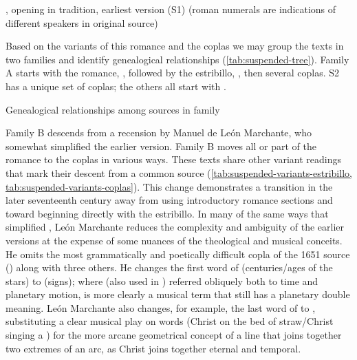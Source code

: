 {, opening  in  tradition, earliest version (S1) (roman numerals are indications of
different speakers in original source)}

Based on the variants of this romance and the coplas we may group the
texts in two families and identify genealogical relationships
(\cref{tab:suspended-tree}). %
Family A starts with the romance, ,
followed by the estribillo, ,
then several coplas.
S2 has a unique set of coplas; the others all start with .

{Genealogical relationships among sources in  family}

Family B descends from a recension by Manuel de León Marchante, who somewhat
simplified the earlier version.%
    \citXXX[on Marchante]
Family B moves all or part of the romance to the coplas in various ways.
These texts share other variant readings that mark their descent from a common
source (\cref{tab:suspended-variants-estribillo, 
tab:suspended-variants-coplas}).
This change demonstrates a transition in the later seventeenth century away from
using introductory romance sections and toward beginning directly with
the estribillo.%
In many of the same ways that  simplified
, León Marchante reduces the complexity and
ambiguity of the earlier versions at the expense of some nuances of the
theological and musical conceits.
He omits the most grammatically and poetically difficult copla of the 1651
source () along with three others.
He changes the first word of  (centuries/ages of
the stars) to  (signs); where  (also used in
) referred obliquely both to time and planetary motion,
 is more clearly a musical term that still has a planetary
double meaning.
León Marchante also changes, for example, the last word of  to , substituting a clear musical play on words
(Christ  on the bed of straw/Christ singing a )
for the more arcane geometrical concept of a line that joins together two
extremes of an arc, as Christ joins together eternal and temporal.

